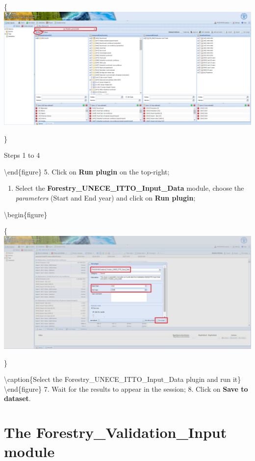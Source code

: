 \documentclass[
]{book}
\providecommand{\tightlist}{%
  \setlength{\itemsep}{0pt}\setlength{\parskip}{0pt}}
\begin{document}
\{\centering \includegraphics[width=1\linewidth]{images/query_forestry_unece_itto_input_data_plugin}

\}

\caption{Steps 1 to 4}

\label{fig:queryUneceItto}
\textbackslash end\{figure\}
5. Click on \textbf{Run plugin} on the top-right;

\begin{enumerate}
\def\labelenumi{\arabic{enumi}.}
\setcounter{enumi}{5}
\tightlist
\item
  Select the \textbf{Forestry\_UNECE\_ITTO\_Input\_Data} module, choose the \emph{parameters} (Start and End year) and click on \textbf{Run plugin};
\end{enumerate}

\textbackslash begin\{figure\}

\{\centering \includegraphics[width=1\linewidth]{images/forestry_select_plugin_unece_itto_input_data}

\}

\textbackslash caption\{Select the Forestry\_UNECE\_ITTO\_Input\_Data plugin and run it\}\label{fig:UneceIttoPlugin}
\textbackslash end\{figure\}
7. Wait for the results to appear in the session;
8. Click on \textbf{Save to dataset}.

\hypertarget{ForestryValidationInput}{%
\chapter{\texorpdfstring{\textbf{The Forestry\_Validation\_Input module}}{The Forestry\_Validation\_Input module}}\label{ForestryValidationInput}}
\end{document}
